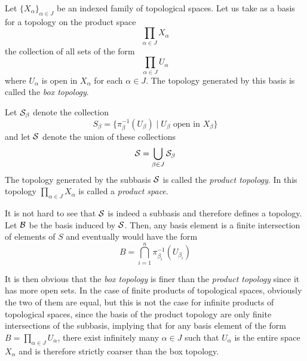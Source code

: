 \begin{definition}
    Let $\{X_\alpha\}_{\alpha\in J}$ be an indexed family of topological spaces. Let us take as a basis for a topology on the product space 
    \begin{equation*}
        \prod_{\alpha\in J}X_\alpha
    \end{equation*}
    the collection of all sets of the form 
    \begin{equation*}
        \prod_{\alpha\in J}U_\alpha
    \end{equation*}
    where $U_\alpha$ is open in $X_\alpha$ for each $\alpha\in J$. The topology generated by this basis is called the \textit{box topology}.
\end{definition}

\begin{definition}
    Let $\S_\beta$ denote the collection 
    \begin{equation*}
        S_\beta = \{\pi_\beta^{-1}(U_\beta)\mid \text{$U_\beta$ open in $X_\beta$}\}
    \end{equation*}
    and let $\S$ denote the union of these collections 
    \begin{equation*}
        \S = \bigcup_{\beta\in J}\S_\beta
    \end{equation*}
    The topology generated by the subbasis $\S$ is called the \textit{product topology}. In this topology $\prod_{\alpha\in J}X_\alpha$ is called a \textit{product space}.
\end{definition}

It is not hard to see that $\S$ is indeed a subbasis and therefore defines a topology. Let $\B$ be the basis induced by $\S$. Then, any basis element is a finite intersection of elements of $S$ and eventually would have the form 
\begin{equation*}
    B = \bigcap_{i=1}^n\pi_{\beta_i}^{-1}(U_{\beta_i})
\end{equation*}

It is then obvious that the \textit{box topology} is finer than the \textit{product topology} since it has more open sets. In the case of finite products of topological spaces, obviously the two of them are equal, but this is not the case for infinite products of topological spaces, since the basis of the product topology are only finite intersections of the subbasis, implying that for any basis element of the form $B = \prod_{\alpha\in J}U_\alpha$, there exist infinitely many $\alpha\in J$ such that $U_\alpha$ is the entire space $X_\alpha$ and is therefore strictly coarser than the box topology.

